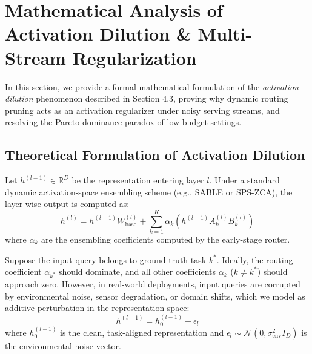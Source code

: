 \documentclass{article}
\theoremstyle{plain}
\theoremstyle{definition}
\theoremstyle{remark}
\begin{document}










\newpage
\appendix
\onecolumn

\section{Mathematical Analysis of Activation Dilution \& Multi-Stream Regularization}
\label{app:activation_dilution}

In this section, we provide a formal mathematical formulation of the \emph{activation dilution} phenomenon described in Section 4.3, proving why dynamic routing pruning acts as an activation regularizer under noisy serving streams, and resolving the Pareto-dominance paradox of low-budget settings.

\subsection{Theoretical Formulation of Activation Dilution}
Let $h^{(l-1)} \in \mathbb{R}^D$ be the representation entering layer $l$. Under a standard dynamic activation-space ensembling scheme (e.g., SABLE or SPS-ZCA), the layer-wise output is computed as:
\begin{equation}
h^{(l)} = h^{(l-1)} W_{\text{base}}^{(l)} + \sum_{k=1}^K \alpha_k \left( h^{(l-1)} A_k^{(l)} B_k^{(l)} \right)
\label{eq:app_forward}
\end{equation}
where $\alpha_k$ are the ensembling coefficients computed by the early-stage router.

Suppose the input query belongs to ground-truth task $k^*$. Ideally, the routing coefficient $\alpha_{k^*}$ should dominate, and all other coefficients $\alpha_k$ ($k \neq k^*$) should approach zero. However, in real-world deployments, input queries are corrupted by environmental noise, sensor degradation, or domain shifts, which we model as additive perturbation in the representation space:
\begin{equation}
h^{(l-1)} = h_0^{(l-1)} + \epsilon_l
\label{eq:app_noise}
\end{equation}
where $h_0^{(l-1)}$ is the clean, task-aligned representation and $\epsilon_l \sim \mathcal{N}(0, \sigma_{\text{env}}^2 I_D)$ is the environmental noise vector.
\end{document}
